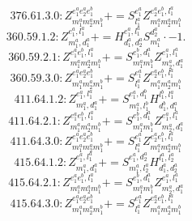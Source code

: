 \documentclass[letterpaper,10pt,fleqn,leqno,onecolumn]{article}
\begin{document}
\begin{equation} \;\;\;\;\;\;  376.61.3.0: Z^{e_{1}^{a}e_{2}^{a}e_{1}^{b}}_{m_{1}^{a}m_{2}^{a}m_{1}^{b}}+=S^{e_{1}^{a}}_{l_{1}^{a}}Z^{e_{2}^{a}e_{1}^{b},l_{1}^{a}}_{m_{1}^{a}m_{2}^{a}m_{1}^{b}} \end{equation}
\begin{equation} \;\;\;\;\;\;  360.59.1.2: Z^{e_{1}^{a},l_{1}^{a}}_{m_{1}^{a},d_{1}^{a}}+=H^{e_{1}^{a},l_{1}^{a}}_{d_{1}^{a},d_{2}^{a}}S^{d_{2}^{a}}_{m_{1}^{a}}\cdot -1. \end{equation}
\begin{equation} \;\;\;\;\;\;  360.59.2.1: Z^{e_{1}^{a}e_{1}^{b},l_{1}^{a}}_{m_{1}^{a}m_{2}^{a}m_{1}^{b}}+=S^{e_{1}^{b},d_{1}^{a}}_{m_{1}^{a}m_{1}^{b}}Z^{e_{1}^{a},l_{1}^{a}}_{m_{2}^{a},d_{1}^{a}} \end{equation}
\begin{equation} \;\;\;\;\;\;  360.59.3.0: Z^{e_{1}^{a}e_{2}^{a}e_{1}^{b}}_{m_{1}^{a}m_{2}^{a}m_{1}^{b}}+=S^{e_{1}^{a}}_{l_{1}^{a}}Z^{e_{2}^{a}e_{1}^{b},l_{1}^{a}}_{m_{1}^{a}m_{2}^{a}m_{1}^{b}} \end{equation}
\begin{equation} \;\;\;\;\;\;  411.64.1.2: Z^{e_{1}^{a},l_{1}^{a}}_{m_{1}^{a},d_{1}^{a}}+=S^{e_{1}^{a},d_{1}^{b}}_{m_{1}^{a},l_{1}^{b}}H^{l_{1}^{b},l_{1}^{a}}_{d_{1}^{b},d_{1}^{a}} \end{equation}
\begin{equation} \;\;\;\;\;\;  411.64.2.1: Z^{e_{1}^{a}e_{1}^{b},l_{1}^{a}}_{m_{1}^{a}m_{2}^{a}m_{1}^{b}}+=S^{e_{1}^{b},d_{1}^{a}}_{m_{1}^{a}m_{1}^{b}}Z^{e_{1}^{a},l_{1}^{a}}_{m_{2}^{a},d_{1}^{a}} \end{equation}
\begin{equation} \;\;\;\;\;\;  411.64.3.0: Z^{e_{1}^{a}e_{2}^{a}e_{1}^{b}}_{m_{1}^{a}m_{2}^{a}m_{1}^{b}}+=S^{e_{1}^{a}}_{l_{1}^{a}}Z^{e_{2}^{a}e_{1}^{b},l_{1}^{a}}_{m_{1}^{a}m_{2}^{a}m_{1}^{b}} \end{equation}
\begin{equation} \;\;\;\;\;\;  415.64.1.2: Z^{e_{1}^{a},l_{1}^{a}}_{m_{1}^{a},d_{1}^{a}}+=S^{e_{1}^{a},d_{2}^{a}}_{m_{1}^{a},l_{2}^{a}}H^{l_{1}^{a},l_{2}^{a}}_{d_{1}^{a},d_{2}^{a}} \end{equation}
\begin{equation} \;\;\;\;\;\;  415.64.2.1: Z^{e_{1}^{a}e_{1}^{b},l_{1}^{a}}_{m_{1}^{a}m_{2}^{a}m_{1}^{b}}+=S^{e_{1}^{b},d_{1}^{a}}_{m_{1}^{a}m_{1}^{b}}Z^{e_{1}^{a},l_{1}^{a}}_{m_{2}^{a},d_{1}^{a}} \end{equation}
\begin{equation} \;\;\;\;\;\;  415.64.3.0: Z^{e_{1}^{a}e_{2}^{a}e_{1}^{b}}_{m_{1}^{a}m_{2}^{a}m_{1}^{b}}+=S^{e_{1}^{a}}_{l_{1}^{a}}Z^{e_{2}^{a}e_{1}^{b},l_{1}^{a}}_{m_{1}^{a}m_{2}^{a}m_{1}^{b}} \end{equation}
\end{document}
